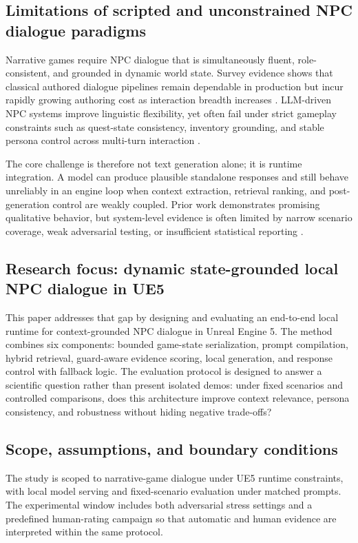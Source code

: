 ﻿\documentclass[a4paper,12pt]{article}
\begin{document}
\subsection{Limitations of scripted and unconstrained NPC dialogue paradigms}
Narrative games require NPC dialogue that is simultaneously fluent, role-consistent, and grounded in dynamic world state. Survey evidence shows that classical authored dialogue pipelines remain dependable in production but incur rapidly growing authoring cost as interaction breadth increases \cite{Gallotta2024Survey,Sweetser2024Scoping}. LLM-driven NPC systems improve linguistic flexibility, yet often fail under strict gameplay constraints such as quest-state consistency, inventory grounding, and stable persona control across multi-turn interaction \cite{Park2023GenerativeAgents,Gallotta2024Survey,Sweetser2024Scoping}.

The core challenge is therefore not text generation alone; it is runtime integration. A model can produce plausible standalone responses and still behave unreliably in an engine loop when context extraction, retrieval ranking, and post-generation control are weakly coupled. Prior work demonstrates promising qualitative behavior, but system-level evidence is often limited by narrow scenario coverage, weak adversarial testing, or insufficient statistical reporting \cite{Gallotta2024Survey,Rao2024Minecraft}.

\subsection{Research focus: dynamic state-grounded local NPC dialogue in UE5}
This paper addresses that gap by designing and evaluating an end-to-end local runtime for context-grounded NPC dialogue in Unreal Engine 5. The method combines six components: bounded game-state serialization, prompt compilation, hybrid retrieval, guard-aware evidence scoring, local generation, and response control with fallback logic. The evaluation protocol is designed to answer a scientific question rather than present isolated demos: under fixed scenarios and controlled comparisons, does this architecture improve context relevance, persona consistency, and robustness without hiding negative trade-offs?

\subsection{Scope, assumptions, and boundary conditions}
The study is scoped to narrative-game dialogue under UE5 runtime constraints, with local model serving and fixed-scenario evaluation under matched prompts. The experimental window includes both adversarial stress settings and a predefined human-rating campaign so that automatic and human evidence are interpreted within the same protocol.
\end{document}
